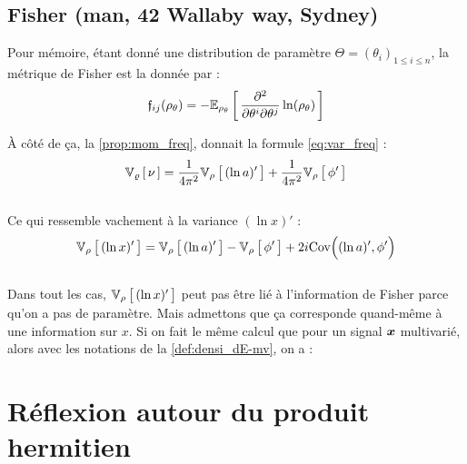 \subsection{Fisher (man, 42 Wallaby way, Sydney)}

Pour mémoire, étant donné une distribution de paramètre $\Theta=(\theta_i)_{1\leq i\leq n}$, la métrique de Fisher est la donnée par :
\begin{equation} \label{eq:fisher_inf}
	\mathfrak{f}_{ij}(\rho_\theta) = -\esp[\rho_\theta]{\frac{\partial^2}{\partial \theta^i \partial \theta^j} \ln(\rho_\theta)}
\end{equation}

\`A côté de ça, la \cref{prop:mom_freq}, donnait la formule \eqref{eq:var_freq} :
\[\var[\densis]{\nu} = \frac{1}{4\pi^2}\var[\densit]{(\ln a)'\big.} +\frac{1}{4\pi^2} \var[\densit]{\phi'\big.}\]
\\
Ce qui ressemble vachement à la variance $(\ln x)'$ :
\begin{equation} \label{eq: var_lnx}
	\var[\densit]{(\ln x)'\big.} = \var[\densit]{(\ln a)'\big.} - \var[\densit]{\phi'\big.} + 2i\text{Cov}\Big( (\ln a)', \phi' \Big)
\end{equation}
\\

Dans tout les cas, $\var[\densit]{(\ln x)'\big.}$ peut pas être lié à l'information de Fisher parce qu'on a pas de paramètre. Mais admettons que ça corresponde quand-même à une information sur $x$. Si on fait le même calcul que pour un signal $\bf{x}$ multivarié, alors avec les notations de la \cref{def:densi_dE-mv}, on a :






 


\section{Réflexion autour du produit hermitien}

